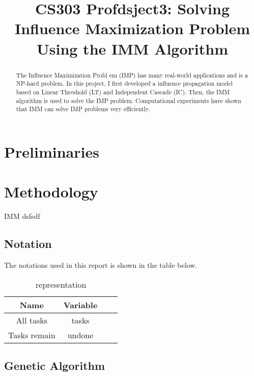 \documentclass[conference]{IEEEtran}
\begin{document}
  
  \title{CS303 Profdsject3: Solving Influence Maximization Problem Using the IMM Algorithm}
  
  \author{
  }
  
  \maketitle
  
  \begin{abstract}
  The Influence Maximization Probl em (IMP) has many real-world applications and is a NP-hard problem. In this project, I first developed a influence propagation model based on Linear Threshold (LT) and Independent Cascade (IC). Then, the IMM algorithm is used to solve the IMP problem. Computational experiments have shown that IMM can solve IMP problems very efficiently.
  \end{abstract}
  \IEEEpeerreviewmaketitle
  
  \section{Preliminaries}

  
\section{Methodology}
IMM \cite{Tang:2015:IMN:2723372.2723734}
dsfsdf
\subsection{Notation}
The notations used in this report is shown in the table below.
    \begin{table}[H]
	\caption{representation}
	\centering
    \begin{tabular}{cccc}
    \toprule
    Name&Variable\\
    \midrule
    All tasks&tasks\\
    Tasks remain&undone\\
	\bottomrule
	\end{tabular}
	\label{table:1}
	\end{table}
\subsection{Genetic Algorithm}
\end{document}
